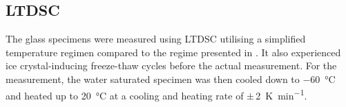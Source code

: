 

\FloatBarrier
\subsection{\acs*{LTDSC}}

The glass specimens were measured using \ac{LTDSC} utilising a simplified temperature regimen compared to the regime presented in .
It also experienced ice crystal-inducing freeze-thaw cycles before the actual measurement.
For the measurement, the water saturated specimen was then cooled down to \qty{-60}{\celsius} and heated up to \qty{20}{\celsius} at a cooling and heating rate of $\pm$\,\qty{2}{\kelvin\per\minute}.

